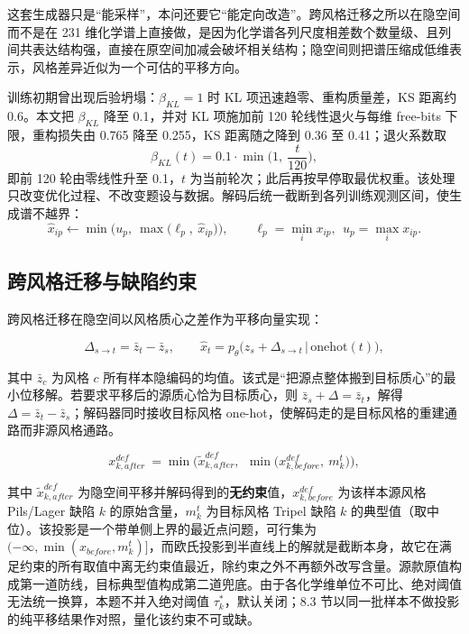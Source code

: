 \documentclass[zihao=-4,a4paper,UTF8,fontset=none]{ctexart}
\begin{document}
这套生成器只是“能采样”，本问还要它“能定向改造”。跨风格迁移之所以在隐空间而不是在 231 维化学谱上直接做，是因为化学谱各列尺度相差数个数量级、且列间共表达结构强，直接在原空间加减会破坏相关结构；隐空间则把谱压缩成低维表示，风格差异近似为一个可估的平移方向。

训练初期曾出现后验坍塌：$\beta_{KL}=1$ 时 KL 项迅速趋零、重构质量差，KS 距离约 0.6。本文把 $\beta_{KL}$ 降至 0.1，并对 KL 项施加前 120 轮线性退火与每维 free-bits 下限，重构损失由 0.765 降至 0.255，KS 距离随之降到 0.36 至 0.41；退火系数取
\begin{equation}
\beta_{KL}(t)=0.1\cdot\min\!\Big(1,\ \frac{t}{120}\Big),
\end{equation}
即前 120 轮由零线性升至 0.1，$t$ 为当前轮次；此后再按早停取最优权重。该处理只改变优化过程、不改变题设与数据。解码后统一截断到各列训练观测区间，使生成谱不越界：
\begin{equation}
\hat x_{ip}\leftarrow\min\!\Big(u_p,\ \max\big(\ell_p,\ \hat x_{ip}\big)\Big),\qquad \ell_p=\min_i x_{ip},\ \ u_p=\max_i x_{ip}.
\end{equation}

\subsection{跨风格迁移与缺陷约束}

跨风格迁移在隐空间以风格质心之差作为平移向量实现：

\begin{equation}
\Delta_{s\to t}=\bar z_t-\bar z_s,\qquad \hat x_{t}=p_\theta\big(z_s+\Delta_{s\to t}\,\big|\,\mathrm{onehot}(t)\big),
\end{equation}

其中 $\bar z_c$ 为风格 $c$ 所有样本隐编码的均值。该式是“把源点整体搬到目标质心”的最小位移解。若要求平移后的源质心恰为目标质心，则 $\bar z_s+\Delta=\bar z_t$，解得 $\Delta=\bar z_t-\bar z_s$；解码器同时接收目标风格 one-hot，使解码走的是目标风格的重建通路而非源风格通路。

\begin{equation}
x^{def}_{k,after}\ =\min\!\Big(\tilde x^{def}_{k,after},\ \ \min\big(x^{def}_{k,before},\ m^t_k\big)\Big),
\end{equation}

其中 $\tilde x^{def}_{k,after}$ 为隐空间平移并解码得到的\textbf{无约束}值，$x^{def}_{k,before}$ 为该样本源风格 Pils/Lager 缺陷 $k$ 的原始含量，$m^t_k$ 为目标风格 Tripel 缺陷 $k$ 的典型值（取中位）。该投影是一个带单侧上界的最近点问题，可行集为 $(-\infty,\min(x_{before},m^t_k)]$，而欧氏投影到半直线上的解就是截断本身，故它在满足约束的所有取值中离无约束值最近，除约束之外不再额外改写含量。源款原值构成第一道防线，目标典型值构成第二道兜底。由于各化学维单位不可比、绝对阈值无法统一换算，本题不并入绝对阈值 $\tau^{*}_k$，默认关闭；8.3 节以同一批样本不做投影的纯平移结果作对照，量化该约束不可或缺。
\end{document}
